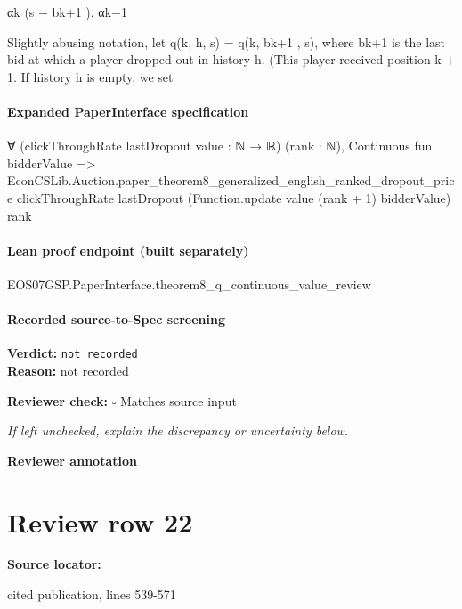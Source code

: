 \documentclass[10pt]{article}
\newcommand{\reviewerbox}{%
  \par\noindent\fbox{\parbox{0.96\linewidth}{\rule{0pt}{0.38in}}}\par
}
\newcommand{\reviewmatch}[1]{%
  \par\noindent\textbf{Reviewer check:} $\square$\; #1\par
  \noindent\emph{If left unchecked, explain the discrepancy or uncertainty below.}\par
}
\begin{document}
\begin{ReviewVerbatim}
αk
(s − bk+1 ).
αk−1

Slightly abusing notation, let q(k, h, s) = q(k, bk+1 , s), where bk+1 is the last bid at which a player
dropped out in history h. (This player received position k + 1. If history h is empty, we set
\end{ReviewVerbatim}


\paragraph{Expanded PaperInterface specification}
\begin{ReviewVerbatim}
∀ (clickThroughRate lastDropout value : ℕ → ℝ) (rank : ℕ),
  Continuous fun bidderValue =>
    EconCSLib.Auction.paper_theorem8_generalized_english_ranked_dropout_price clickThroughRate lastDropout
      (Function.update value (rank + 1) bidderValue) rank
\end{ReviewVerbatim}

\paragraph{Lean proof endpoint (built separately)}\begin{ReviewVerbatim}
EOS07GSP.PaperInterface.theorem8_q_continuous_value_review
\end{ReviewVerbatim}

\paragraph{Recorded source-to-Spec screening}
\textbf{Verdict:} \texttt{not recorded}
\\
\textbf{Reason:} not recorded
\reviewmatch{Matches source input}
\noindent\textbf{Reviewer annotation}\par
\reviewerbox
\clearpage
\hypertarget{source-claim-d9e971bf09bd7b21}{}
\section*{Review row 22}
\textbf{Source locator:} {\footnotesize\raggedright cited publication, lines 539-\allowbreak{}571\par}
\end{document}
